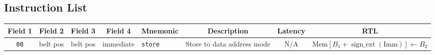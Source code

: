 \documentclass{article}
\begin{document}
\clearpage
\begin{landscape}
\section{Instruction List}

	\begin{longtable}{c c c c l l c l}
		\multicolumn{1}{c}{Field 1} &
		\multicolumn{1}{c}{Field 2} &
		\multicolumn{1}{c}{Field 3} &
		\multicolumn{1}{c}{Field 4} &
		\multicolumn{1}{c}{Mnemonic} &
		\multicolumn{1}{c}{Description} &
		\multicolumn{1}{c}{Latency} &
		\multicolumn{1}{c}{RTL} \\
		\midrule
		\texttt{00} & belt pos & belt pos & immediate & \texttt{store} & Store to data address mode & N/A &
			\(\textrm{Mem}\left[B_1 + \operatorname{sign\_ext}\left(\textrm{Imm}\right)\right] \gets B_2\) \\


\end{longtable}
\end{landscape}
\end{document}
